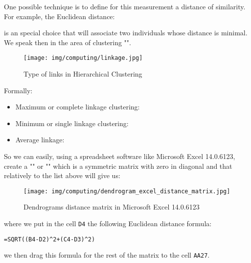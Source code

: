 	One possible technique is to define for this measurement a distance of similarity. For example, the Euclidean distance:
	
	is an special choice that will associate two individuals whose distance is minimal. We speak then in the area of clustering "".
	\begin{figure}[H]
		\centering
		\texttt{[image: img/computing/linkage.jpg]}
		\caption{Type of links in Hierarchical Clustering}
	\end{figure}
	Formally:
	\begin{itemize}
		\item Maximum or complete linkage clustering:
		
	
		\item Minimum or single linkage clustering:
		
	
		\item Average linkage:
		
	\end{itemize}
	So we can easily, using a spreadsheet software like Microsoft Excel 14.0.6123, create a "" or "" which is a symmetric matrix with zero in diagonal and that relatively to the list above will give us:
	\begin{figure}[H]
		\centering
		\texttt{[image: img/computing/dendrogram\_excel\_distance\_matrix.jpg]}
		\caption[]{Dendrograms distance matrix in Microsoft Excel 14.0.6123}
	\end{figure}
	where we put in the cell \texttt{D4} the following Euclidean distance formula:
	\begin{center}
		\texttt{=SQRT((B4-D2)\string^2+(C4-D3)\string^2)}
	\end{center}
	we then drag this formula for the rest of the matrix to the cell \texttt{AA27}.

